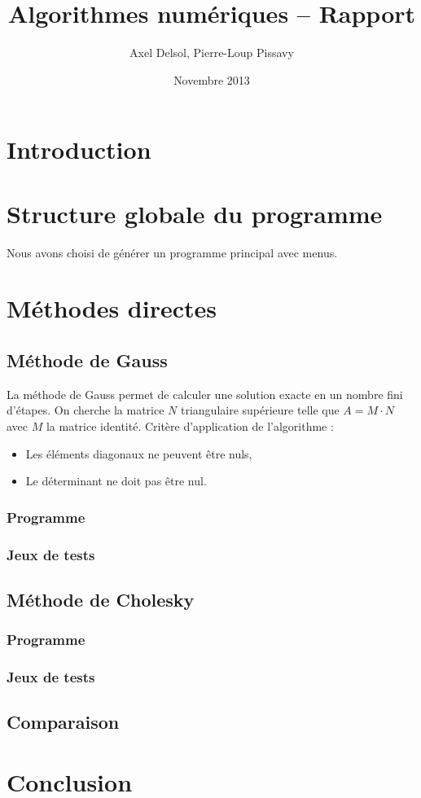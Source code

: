 \documentclass{report}
\title{Algorithmes numériques -- Rapport}
\author{Axel Delsol, Pierre-Loup Pissavy}
\date{Novembre 2013}
\begin{document}
  \maketitle
  \tableofcontents

  \chapter*{Introduction}
    \lipsum[1-5]
  \chapter{Structure globale du programme}
    Nous avons choisi de générer un programme principal avec menus.
  \chapter{Méthodes directes}
    \section{Méthode de Gauss}
      La méthode de Gauss permet de calculer une solution exacte en un nombre fini d'étapes.
      \newline
      On cherche la matrice $N$ triangulaire supérieure telle que $A = M \cdot N$ avec $M$ la matrice identité.
      \newline
      Critère d'application de l'algorithme :
      \begin{itemize}
        \item{Les éléments diagonaux ne peuvent être nuls,}
        \item{Le déterminant ne doit pas être nul.}
      \end{itemize}
        \lstset{language=C,showstringspaces=false}
      \subsection{Programme}
        
      \subsection{Jeux de tests}
      
    \section{Méthode de Cholesky}
      \subsection{Programme}
        
      \subsection{Jeux de tests}
      
    \section{Comparaison}
  \chapter*{Conclusion}
\end{document}
